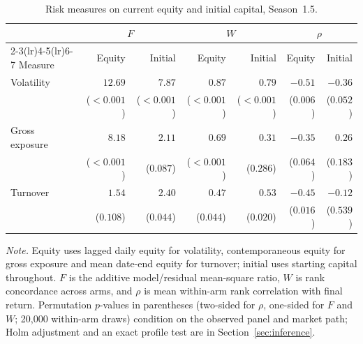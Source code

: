 \begin{table}[ht]
\centering\small
\caption{Risk measures on current equity and initial capital, Season~1.5.}
\label{tab:trait}
\setlength{\tabcolsep}{4pt}
\begin{tabular}{lrrrrrr}
\toprule
 & \multicolumn{2}{c}{$F$} & \multicolumn{2}{c}{$W$} & \multicolumn{2}{c}{$\rho$} \\
\cmidrule(lr){2-3}\cmidrule(lr){4-5}\cmidrule(lr){6-7}
Measure & Equity & Initial & Equity & Initial & Equity & Initial \\
\midrule
Volatility & $12.69$ & $7.87$ & $0.87$ & $0.79$ & $-0.51$ & $-0.36$ \\
 & ($<0.001$) & ($<0.001$) & ($<0.001$) & ($<0.001$) & ($0.006$) & ($0.052$) \\
Gross exposure & $8.18$ & $2.11$ & $0.69$ & $0.31$ & $-0.35$ & $0.26$ \\
 & ($<0.001$) & ($0.087$) & ($<0.001$) & ($0.286$) & ($0.064$) & ($0.183$) \\
Turnover & $1.54$ & $2.40$ & $0.47$ & $0.53$ & $-0.45$ & $-0.12$ \\
 & ($0.108$) & ($0.044$) & ($0.044$) & ($0.020$) & ($0.016$) & ($0.539$) \\
\bottomrule
\end{tabular}
\par\smallskip\parbox{0.92\linewidth}{\footnotesize\textit{Note.} Equity
uses lagged daily equity for volatility, contemporaneous equity for gross
exposure and mean date-end equity for turnover; initial uses starting capital
throughout. $F$ is the additive model/residual mean-square ratio, $W$ is rank
concordance across arms, and $\rho$ is mean within-arm rank correlation with
final return. Permutation $p$-values in parentheses (two-sided for $\rho$,
one-sided for $F$ and $W$; 20{,}000 within-arm draws) condition on the
observed panel and market path; Holm adjustment and an exact profile test are
in Section~\ref{sec:inference}.}
\end{table}
